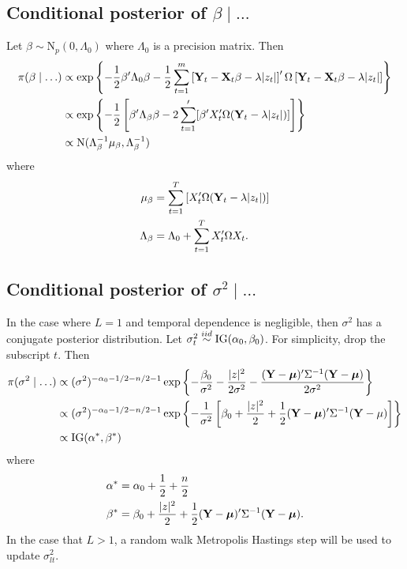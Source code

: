 \subsection*{Conditional posterior of $\beta \mid \ldots$}\label{sts:betapost}
Let $\beta \sim \mbox{N}_{p}(0, \Lambda_0)$ where $\Lambda_0$ is a precision matrix. Then
\begin{align*}
    \pi(\beta \mid \ldots) & \propto \exp \left\{ - \frac{ 1 }{ 2 } \beta^\prime \Lambda_0 \beta - \frac{ 1 }{ 2 } \sum_{t = 1 }^m \left[\mathbf{Y}_t - \mathbf{X}_t \beta - \lambda |z_t| \right]^\prime \Omega \left[\mathbf{Y}_t - \mathbf{X}_t \beta - \lambda |z_t|\right] \right\}\\
     & \propto \exp \left\{ -\frac{ 1 }{ 2 } \left[ \beta^\prime \Lambda_\beta \beta  - 2 \sum_{ t = 1 }^\prime [ \beta^\prime X_t^\prime \Omega (\mathbf{Y}_t - \lambda |z_t| )] \right] \right\}\\
     & \propto \mbox{N} ( \Lambda_\beta^{-1} \mu_\beta , \Lambda_\beta^{-1})
\end{align*}
where
\begin{align*}
    \mu_\beta &= \sum_{t=1}^{T} \left[ X_t^\prime \Omega (\mathbf{Y}_t - \lambda |z_t|) \right]\\
    \Lambda_\beta &= \Lambda_0 + \sum_{ t = 1 }^{ T} X_t^\prime \Omega X_t.
\end{align*}

\subsection*{Conditional posterior of $\sigma^2 \mid \ldots$}\label{sts:sigpost}
In the case where $L = 1$ and temporal dependence is negligible, then $\sigma^2$ has a conjugate posterior distribution.
Let $\sigma_t^2 \stackrel{iid}{\sim} \mbox{IG}(\alpha_0, \beta_0)$. For simplicity, drop the subscript $t$. Then
\begin{align*}
    \pi(\sigma^2 \mid \ldots) & \propto (\sigma^2)^{ -\alpha_0 - 1 / 2 - n / 2 - 1} \exp \left\{ -\frac{\beta_0}{\sigma^2} - \frac{ |z|^2 }{2 \sigma^2} - \frac{ (\mathbf{Y} - \mbox{\boldmath $\mu$})^\prime \Sigma^{-1} (\mathbf{Y} - \mbox{\boldmath $\mu$}) }{2 \sigma^2} \right\} \\
    & \propto (\sigma^2)^{ -\alpha_0 - 1 / 2 - n / 2 - 1} \exp \left\{ - \frac{ 1 }{ \sigma^2 } \left[\beta_0 + \frac{ |z|^2 }{ 2 } + \frac{ 1 }{ 2 } (\mathbf{Y} - \mbox{\boldmath $\mu$})^\prime \Sigma^{-1} (\mathbf{Y} - \mu) \right] \right\} \\
    & \propto \mbox{IG} (\alpha^*, \beta^*)
\end{align*}
where
\begin{align*}
    \alpha^* &= \alpha_0 + \frac{1}{2} + \frac{n}{2} \\
    \beta^* &= \beta_0 + \frac{ |z|^2 }{ 2 } + \frac{ 1 }{ 2 }(\mathbf{Y} - \mbox{\boldmath $\mu$})^\prime \Sigma^{-1} (\mathbf{Y} - \mbox{\boldmath $\mu$}).
\end{align*}
In the case that $L > 1$, a random walk Metropolis Hastings step will be used to update $\sigma^2_{lt}$.

